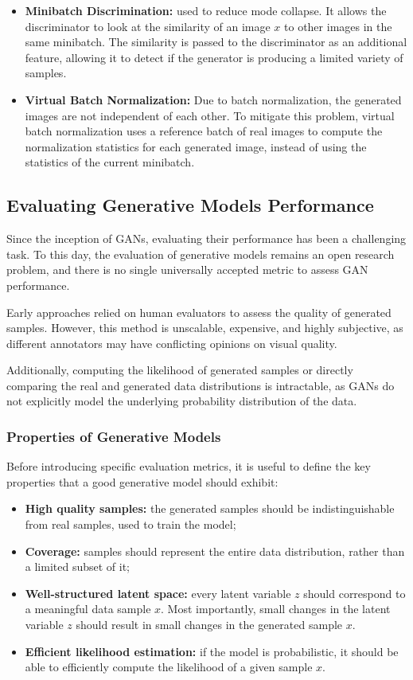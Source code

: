\begin{itemize}
    \item \textbf{Minibatch Discrimination:} used to reduce mode collapse. It allows the discriminator to look at
    the similarity of an image $x$ to other images in the same minibatch. The similarity is passed to the discriminator as an additional feature,
    allowing it to detect if the generator is producing a limited variety of samples.
    \item \textbf{Virtual Batch Normalization:} Due to batch normalization, the generated images are not independent of each other.
    To mitigate this problem, virtual batch normalization uses a reference batch of real images to compute the normalization statistics for each generated image,
    instead of using the statistics of the current minibatch.
\end{itemize}

\subsection{Evaluating Generative Models Performance}
\label{subsec:evaluating-generative-models}
Since the inception of GANs, evaluating their performance has been a challenging task. To this day, the evaluation of generative models remains an open research problem, and there is no single universally accepted metric to assess GAN performance.

Early approaches relied on human evaluators to assess the quality of generated samples. However, this method is unscalable, expensive, and highly subjective, as different annotators may have conflicting opinions on visual quality.

Additionally, computing the likelihood of generated samples or directly comparing the real and generated data distributions is intractable, as GANs do not explicitly model the underlying probability distribution of the data.

\subsubsection{Properties of Generative Models}
Before introducing specific evaluation metrics, it is useful to define the key properties that a good generative model should exhibit:
\begin{itemize}
    \item \textbf{High quality samples:} the generated samples should be indistinguishable from real samples, used to train the model;
    \item \textbf{Coverage:} samples should represent the entire data distribution, rather than a limited subset of it;
    \item \textbf{Well-structured latent space:} every latent variable $z$ should correspond to a meaningful data sample $x$.
    Most importantly, small changes in the latent variable $z$ should result in small changes in the generated sample $x$.
    \item \textbf{Efficient likelihood estimation:} if the model is probabilistic, it should be able to efficiently compute the likelihood of a given sample $x$.
\end{itemize}

